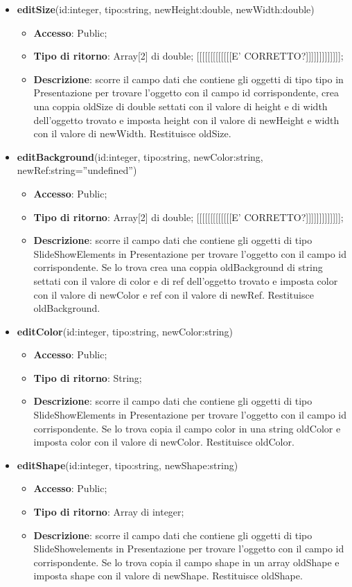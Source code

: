 {{\begin{itemize}
\begin{itemize}
			\end{itemize}
			\item \textbf{editSize}(id:integer, tipo:string,  newHeight:double, newWidth:double)
			\begin{itemize}
				\item \textbf{Accesso}: Public;
				\item \textbf{Tipo di ritorno}: Array[2] di double; [[[[[[[[[[[[[E' CORRETTO?]]]]]]]]]]]]];
				\item \textbf{Descrizione}: scorre il campo dati che contiene gli oggetti di tipo tipo in Presentazione per trovare l’oggetto con il campo id corrispondente, crea una coppia oldSize di double settati con il valore di height e di width dell’oggetto trovato e imposta height con il valore di newHeight e width con il valore di newWidth. Restituisce oldSize.
			\end{itemize}
			\item \textbf{editBackground}(id:integer, tipo:string, newColor:string,  newRef:string=”undefined”)
			\begin{itemize}
				\item \textbf{Accesso}: Public;
				\item \textbf{Tipo di ritorno}: Array[2] di double; [[[[[[[[[[[[[E' CORRETTO?]]]]]]]]]]]]];
				\item \textbf{Descrizione}: scorre il campo dati che contiene gli oggetti di tipo SlideShowElements in Presentazione per trovare l’oggetto con il campo id corrispondente. Se lo trova crea una coppia oldBackground di string settati con il valore di color e di ref dell’oggetto trovato e imposta color con il valore di newColor e ref con il valore di newRef. Restituisce oldBackground.
			\end{itemize}
			\item \textbf{editColor}(id:integer, tipo:string, newColor:string)
			\begin{itemize}
				\item \textbf{Accesso}: Public;
				\item \textbf{Tipo di ritorno}: String;
				\item \textbf{Descrizione}: scorre il campo dati che contiene gli oggetti di tipo SlideShowElements in Presentazione per trovare l’oggetto con il campo id corrispondente. Se lo trova copia il campo color in una string oldColor e imposta color con il valore di newColor. Restituisce oldColor.
			\end{itemize}
			\item \textbf{editShape}(id:integer, tipo:string, newShape:string)
			\begin{itemize}
				\item \textbf{Accesso}: Public;
				\item \textbf{Tipo di ritorno}: Array di integer;
				\item \textbf{Descrizione}: scorre il campo dati che contiene gli oggetti di tipo SlideShowelements in Presentazione per trovare l’oggetto con il campo id corrispondente. Se lo trova copia il campo shape in un array oldShape e imposta shape con il valore di newShape. Restituisce oldShape.
			\end{itemize}
		\end{itemize}
		}
	}
